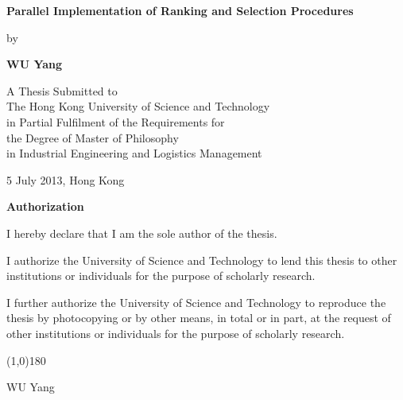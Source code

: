 \documentclass[12pt,a4paper]{report}
\begin{document}

\null\vspace{0.5in}
\begin{center}
{\Large\bf Parallel Implementation of Ranking and Selection Procedures}
\vspace{2.5cm}

{\large by}
\vspace{0.5cm}

{\large\bf WU Yang}\normalsize
\vspace{1cm}

A Thesis Submitted to \\
The Hong Kong University of Science and Technology \\
in Partial Fulfilment of the Requirements for \\
the Degree of Master of Philosophy \\
in Industrial Engineering and Logistics Management
\vspace{1.5cm}

5 July 2013, Hong Kong
\end{center}
\thispagestyle{empty}
\newpage

\begin{center}{\Large\bf Authorization}\normalsize
\end{center}
\vspace{0.5cm}

I hereby declare that I am the sole author of the thesis.

\vspace{0.5cm}

I authorize the University of Science and Technology to lend this thesis
to other institutions or individuals for the purpose of scholarly research.

\vspace{0.5cm}

I further authorize the University of Science and Technology to
reproduce the thesis by photocopying or by other means, in total or in
part, at the request of other institutions or individuals for the
purpose of scholarly research.

\vspace{1.5cm}

\begin{center}
\line(1,0){180}
\smallskip

WU Yang
\end{center}
\end{document}
